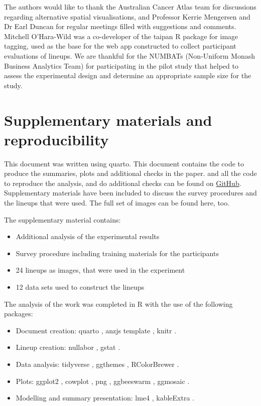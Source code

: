 \documentclass[
doublespace,
  times]{anzsauth}
\providecommand{\tightlist}{%
  \setlength{\itemsep}{0pt}\setlength{\parskip}{0pt}}
\begin{document}
The authors would like to thank the Australian Cancer Atlas team for
discussions regarding alternative spatial visualisations, and Professor
Kerrie Mengersen and Dr Earl Duncan for regular meetings filled with
suggestions and comments. Mitchell O'Hara-Wild was a co-developer of the
taipan \citep{taipan} R package for image tagging, used as the base for
the web app constructed to collect participant evaluations of lineups.
We are thankful for the NUMBATs (Non-Uniform Monash Business Analytics
Team) for participating in the pilot study that helped to assess the
experimental design and determine an appropriate sample size for the
study.

\section*{Supplementary materials and
reproducibility}\label{supplementary-materials-and-reproducibility}

This document was written using quarto. This document contains the code
to produce the summaries, plots and additional checks in the paper. and
all the code to reproduce the analysis, and do additional checks can be
found on \href{https://github.com/srkobakian/experiment/paper}{GitHub}.
Supplementary materials have been included to discuss the survey
procedures and the lineups that were used. The full set of images can be
found here, too.

The supplementary material contains:

\begin{itemize}
\tightlist
\item
  Additional analysis of the experimental results
\item
  Survey procedure including training materials for the participants
\item
  24 lineups as images, that were used in the experiment
\item
  12 data sets used to construct the lineups
\end{itemize}

The analysis of the work was completed in R \citep{RCore} with the use
of the following packages:

\begin{itemize}
\tightlist
\item
  Document creation: quarto \citep{Allaire_Quarto_2025}, anzjs template
  \citep{quarto-anzjs}, knitr \citep{knitr}.
\item
  Lineup creation: nullabor \citep{nullabor}, gstat \citep{gstat}.
\item
  Data analysis: tidyverse \citep{tidyverse}, ggthemes \citep{ggthemes},
  RColorBrewer \citep{RColorBrewer}.
\item
  Plots: ggplot2 \citep{ggplot2}, cowplot \citep{cowplot}, png
  \citep{png}, ggbeeswarm \citep{ggbeeswarm}, ggmosaic \citep{ggmosaic}.
\item
  Modelling and summary presentation: lme4 \citep{lme4}, kableExtra
  \citep{kableExtra}.
\end{itemize}
\end{document}
